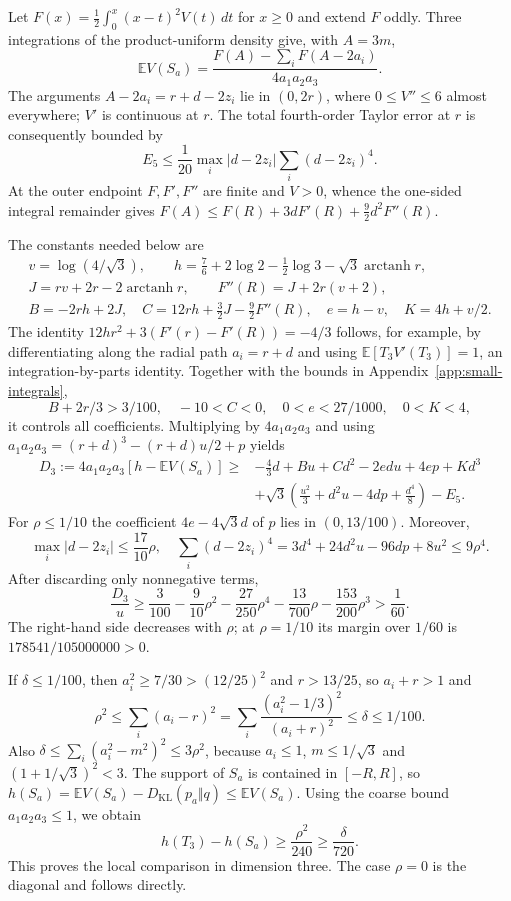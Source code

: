 \documentclass[11pt,a4paper]{article}
\theoremstyle{remark}\newtheorem{remark}[theorem]{Remark}
\newcommand{\E}{\mathbb E}
\newcommand{\KL}{D_{\mathrm{KL}}}
\begin{document}
Let $F(x)=\frac12\int_0^x(x-t)^2V(t)\,dt$ for $x\ge0$ and extend
$F$ oddly. Three integrations of the product-uniform density give, with
$A=3m$,
\[
\E V(S_a)=\frac{F(A)-\sum_iF(A-2a_i)}{4a_1a_2a_3}.
\]
The arguments $A-2a_i=r+d-2z_i$ lie in $(0,2r)$, where
$0\le V''\le6$ almost everywhere; $V'$ is continuous at $r$.
The total fourth-order Taylor error at $r$ is consequently bounded by
\[
E_5\le\frac1{20}\max_i|d-2z_i|\sum_i(d-2z_i)^4.
\]
At the outer endpoint $F,F',F''$ are finite and $V>0$, whence the
one-sided integral remainder gives
$F(A)\le F(R)+3dF'(R)+\frac92d^2F''(R)$.

The constants needed below are
\[
\begin{gathered}
v=\log(4/\sqrt3),\qquad
h=\frac76+2\log2-\frac12\log3-\sqrt3\operatorname{arctanh}r,\\
J=rv+2r-2\operatorname{arctanh}r,
\qquad F''(R)=J+2r(v+2),\\
B=-2rh+2J,\quad C=12rh+\frac32J-\frac92F''(R),
\quad e=h-v,\quad K=4h+v/2.
\end{gathered}
\]
The identity
$12hr^2+3(F'(r)-F'(R))=-4/3$ follows, for example, by differentiating
along the radial path $a_i=r+d$ and using $\E[T_3V'(T_3)]=1$,
an integration-by-parts identity. Together with the bounds in
Appendix~\ref{app:small-integrals},
\[
B+2r/3>3/100,\quad -10<C<0,\quad 0<e<27/1000,\quad0<K<4,
\]
it controls all coefficients. Multiplying by $4a_1a_2a_3$ and using
$a_1a_2a_3=(r+d)^3-(r+d)u/2+p$ yields
\begin{align*}
D_3:=4a_1a_2a_3[h-\E V(S_a)]\ge{}&-\frac43d+Bu+Cd^2-2edu+4ep+Kd^3\\
&+\sqrt3\left(\frac{u^2}{3}+d^2u-4dp+\frac{d^4}{8}\right)-E_5.
\end{align*}
For $\rho\le1/10$ the coefficient $4e-4\sqrt3d$ of $p$ lies in
$(0,13/100)$. Moreover,
\[
\max_i|d-2z_i|\le\frac{17}{10}\rho,
\quad \sum_i(d-2z_i)^4=3d^4+24d^2u-96dp+8u^2\le9\rho^4.
\]
After discarding only nonnegative terms,
\[
\frac{D_3}{u}\ge\frac3{100}-\frac9{10}\rho^2-\frac{27}{250}\rho^4
                  -\frac{13}{700}\rho-\frac{153}{200}\rho^3>\frac1{60}.
\]
The right-hand side decreases with $\rho$; at $\rho=1/10$ its margin
over $1/60$ is $178541/105000000>0$.

If $\delta\le1/100$, then $a_i^2\ge7/30>(12/25)^2$ and
$r>13/25$, so $a_i+r>1$ and
\[
\rho^2\le\sum_i(a_i-r)^2
 =\sum_i\frac{(a_i^2-1/3)^2}{(a_i+r)^2}\le\delta\le1/100.
\]
Also $\delta\le\sum_i(a_i^2-m^2)^2\le3\rho^2$, because
$a_i\le1$, $m\le1/\sqrt3$ and $(1+1/\sqrt3)^2<3$.
The support of $S_a$ is contained in $[-R,R]$, so
$h(S_a)=\E V(S_a)-\KL(p_a\Vert q)\le\E V(S_a)$.
Using the coarse bound $a_1a_2a_3\le1$, we obtain
\[
h(T_3)-h(S_a)\ge\frac{\rho^2}{240}\ge\frac{\delta}{720}.
\]
This proves the local comparison in dimension three. The case $\rho=0$
is the diagonal and follows directly.
\end{document}
